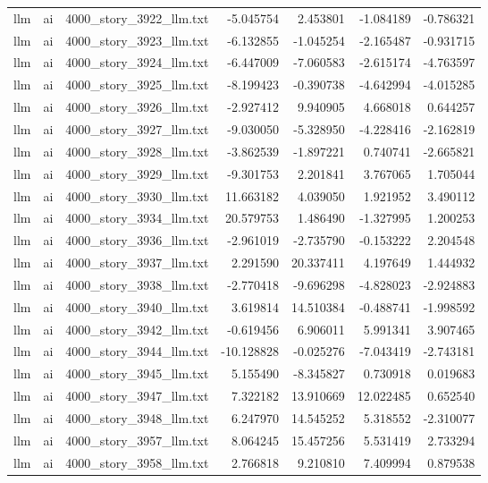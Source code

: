 \begin{longtable}{lllrrrr}
llm & ai & 4000\_story\_3922\_llm.txt & -5.045754 & 2.453801 & -1.084189 & -0.786321 \\
llm & ai & 4000\_story\_3923\_llm.txt & -6.132855 & -1.045254 & -2.165487 & -0.931715 \\
llm & ai & 4000\_story\_3924\_llm.txt & -6.447009 & -7.060583 & -2.615174 & -4.763597 \\
llm & ai & 4000\_story\_3925\_llm.txt & -8.199423 & -0.390738 & -4.642994 & -4.015285 \\
llm & ai & 4000\_story\_3926\_llm.txt & -2.927412 & 9.940905 & 4.668018 & 0.644257 \\
llm & ai & 4000\_story\_3927\_llm.txt & -9.030050 & -5.328950 & -4.228416 & -2.162819 \\
llm & ai & 4000\_story\_3928\_llm.txt & -3.862539 & -1.897221 & 0.740741 & -2.665821 \\
llm & ai & 4000\_story\_3929\_llm.txt & -9.301753 & 2.201841 & 3.767065 & 1.705044 \\
llm & ai & 4000\_story\_3930\_llm.txt & 11.663182 & 4.039050 & 1.921952 & 3.490112 \\
llm & ai & 4000\_story\_3934\_llm.txt & 20.579753 & 1.486490 & -1.327995 & 1.200253 \\
llm & ai & 4000\_story\_3936\_llm.txt & -2.961019 & -2.735790 & -0.153222 & 2.204548 \\
llm & ai & 4000\_story\_3937\_llm.txt & 2.291590 & 20.337411 & 4.197649 & 1.444932 \\
llm & ai & 4000\_story\_3938\_llm.txt & -2.770418 & -9.696298 & -4.828023 & -2.924883 \\
llm & ai & 4000\_story\_3940\_llm.txt & 3.619814 & 14.510384 & -0.488741 & -1.998592 \\
llm & ai & 4000\_story\_3942\_llm.txt & -0.619456 & 6.906011 & 5.991341 & 3.907465 \\
llm & ai & 4000\_story\_3944\_llm.txt & -10.128828 & -0.025276 & -7.043419 & -2.743181 \\
llm & ai & 4000\_story\_3945\_llm.txt & 5.155490 & -8.345827 & 0.730918 & 0.019683 \\
llm & ai & 4000\_story\_3947\_llm.txt & 7.322182 & 13.910669 & 12.022485 & 0.652540 \\
llm & ai & 4000\_story\_3948\_llm.txt & 6.247970 & 14.545252 & 5.318552 & -2.310077 \\
llm & ai & 4000\_story\_3957\_llm.txt & 8.064245 & 15.457256 & 5.531419 & 2.733294 \\
llm & ai & 4000\_story\_3958\_llm.txt & 2.766818 & 9.210810 & 7.409994 & 0.879538 \\

\end{longtable}
